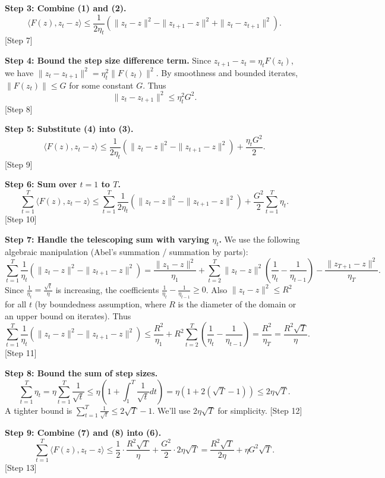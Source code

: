 \documentclass{article}
\begin{document}
\textbf{Step 3: Combine (1) and (2).}
\[
\langle F(z), z_t - z \rangle \le \frac{1}{2\eta_t} \left( \|z_t - z\|^2 - \|z_{t+1} - z\|^2 + \|z_t - z_{t+1}\|^2 \right). \tag{3}
\]
[Step 7]

\textbf{Step 4: Bound the step size difference term.}
Since $z_{t+1} - z_t = \eta_t F(z_t)$, we have $\|z_t - z_{t+1}\|^2 = \eta_t^2 \|F(z_t)\|^2$. By smoothness and bounded iterates, $\|F(z_t)\| \le G$ for some constant $G$. Thus
\[
\|z_t - z_{t+1}\|^2 \le \eta_t^2 G^2. \tag{4}
\]
[Step 8]

\textbf{Step 5: Substitute (4) into (3).}
\[
\langle F(z), z_t - z \rangle \le \frac{1}{2\eta_t} \left( \|z_t - z\|^2 - \|z_{t+1} - z\|^2 \right) + \frac{\eta_t G^2}{2}. \tag{5}
\]
[Step 9]

\textbf{Step 6: Sum over $t = 1$ to $T$.}
\[
\sum_{t=1}^T \langle F(z), z_t - z \rangle \le \sum_{t=1}^T \frac{1}{2\eta_t} \left( \|z_t - z\|^2 - \|z_{t+1} - z\|^2 \right) + \frac{G^2}{2} \sum_{t=1}^T \eta_t. \tag{6}
\]
[Step 10]

\textbf{Step 7: Handle the telescoping sum with varying $\eta_t$.}
We use the following algebraic manipulation (Abel's summation / summation by parts):
\[
\sum_{t=1}^T \frac{1}{\eta_t} \left( \|z_t - z\|^2 - \|z_{t+1} - z\|^2 \right)
= \frac{\|z_1 - z\|^2}{\eta_1} + \sum_{t=2}^T \|z_t - z\|^2 \left( \frac{1}{\eta_t} - \frac{1}{\eta_{t-1}} \right) - \frac{\|z_{T+1} - z\|^2}{\eta_T}.
\]
Since $\frac{1}{\eta_t} = \frac{\sqrt{t}}{\eta}$ is increasing, the coefficients $\frac{1}{\eta_t} - \frac{1}{\eta_{t-1}} \ge 0$. Also $\|z_t - z\|^2 \le R^2$ for all $t$ (by boundedness assumption, where $R$ is the diameter of the domain or an upper bound on iterates). Thus
\[
\sum_{t=1}^T \frac{1}{\eta_t} \left( \|z_t - z\|^2 - \|z_{t+1} - z\|^2 \right)
\le \frac{R^2}{\eta_1} + R^2 \sum_{t=2}^T \left( \frac{1}{\eta_t} - \frac{1}{\eta_{t-1}} \right)
= \frac{R^2}{\eta_T} = \frac{R^2 \sqrt{T}}{\eta}. \tag{7}
\]
[Step 11]

\textbf{Step 8: Bound the sum of step sizes.}
\[
\sum_{t=1}^T \eta_t = \eta \sum_{t=1}^T \frac{1}{\sqrt{t}} \le \eta \left( 1 + \int_1^T \frac{1}{\sqrt{t}} dt \right) = \eta \left( 1 + 2(\sqrt{T} - 1) \right) \le 2\eta \sqrt{T}. \tag{8}
\]
A tighter bound is $\sum_{t=1}^T \frac{1}{\sqrt{t}} \le 2\sqrt{T} - 1$. We'll use $2\eta\sqrt{T}$ for simplicity. [Step 12]

\textbf{Step 9: Combine (7) and (8) into (6).}
\[
\sum_{t=1}^T \langle F(z), z_t - z \rangle \le \frac{1}{2} \cdot \frac{R^2 \sqrt{T}}{\eta} + \frac{G^2}{2} \cdot 2\eta \sqrt{T}
= \frac{R^2 \sqrt{T}}{2\eta} + \eta G^2 \sqrt{T}. \tag{9}
\]
[Step 13]
\end{document}
